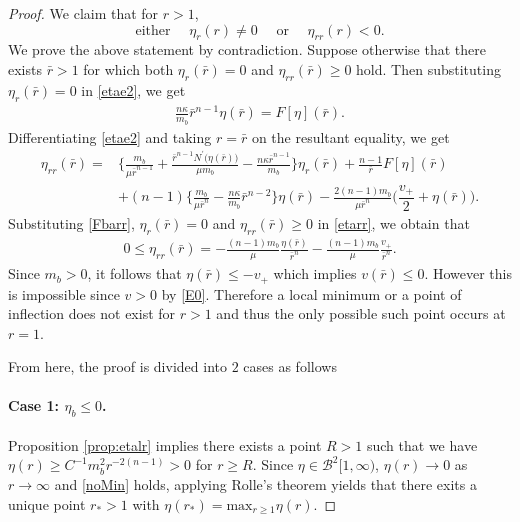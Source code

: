 \documentclass[a4paper,12pt,draft]{article}
\theoremstyle{remark}
\def\d{\partial}
\begin{document}
\begin{proof}
    We claim that for $r>1$,
    \begin{equation}\label{noMin}
        \text{either } \quad  \eta_r(r) \neq 0 \quad \text{ or } \quad \eta_{rr}(r) < 0. 
    \end{equation}
    We prove the above statement by contradiction. Suppose otherwise that there exists $\bar{r}> 1$ for which both $\eta_r(\bar{r}) = 0$ and $ \eta_{rr}(\bar{r})\ge 0$ hold. Then substituting $\eta_r(\bar{r})=0$ in \eqref{etae2}, we get
    \begin{align} \label{Fbarr}
        \frac{n\kappa}{m_b} \bar{r}^{n-1} \eta(\bar{r}) = F[\eta](\bar{r}). 
    \end{align}
    Differentiating \eqref{etae2} and taking $r=\bar{r}$ on the resultant equality, we get
    \begin{align}
        \nonumber \eta_{rr}(\bar{r}) %
        =& \Big\{\frac{m_b}{\mu \bar{r}^{n-1}}+ \frac{\bar{r}^{n-1}N^{\prime}\big(\eta(\bar{r})\big)}{\mu m_b} - \frac{n\kappa \bar{r}^{n-1}}{m_b}\Big\}\eta_r(\bar{r}) +\frac{n-1}{\bar{r}} F[\eta](\bar{r}) \\
        & + (n-1) \Big\{\frac{m_b}{\mu \bar{r}^n} - \frac{n\kappa}{m_b} \bar{r}^{n-2}\Big\}\eta(\bar{r}) - \frac{2(n-1)m_b}{\mu \bar{r}^n}\Big( \dfrac{v_{+}}{2} + \eta(\bar{r}) \Big).\label{etarr}
    \end{align}
    Substituting \eqref{Fbarr}, $\eta_r(\bar{r})=0$ and $\eta_{rr}(\bar{r})\ge 0$ in \eqref{etarr}, we obtain that
    \begin{align*}
        0 \le \eta_{rr}(\bar{r}) = -\frac{(n-1)m_b}{\mu} \frac{\eta(\bar{r})}{\bar{r}^n} - \frac{(n-1)m_b}{\mu} \frac{v_+}{\bar{r}^n}.
    \end{align*}
    Since $m_b>0$, it follows that $\eta(\bar{r})\le - v_{+}$ which implies $v(\bar{r})\le 0$. However this is impossible since $v>0$ by \eqref{E0}. Therefore a local minimum or a point of inflection does not exist for $r>1$ and thus the only possible such point occurs at $r=1$. 
    
    From here, the proof is divided into $2$ cases as follows
    \paragraph{\bf Case 1: $\eta_b \le 0$.} Proposition \ref{prop:etalr} implies there exists a point $R>1$ such that we have $\eta(r)\ge C^{-1} m_b^2 r^{-2(n-1)}>0$ for $r\ge R$. Since $\eta\in \mathcal{B}^2[1,\infty)$, $\eta(r)\to 0$ as $r\to \infty$ and \eqref{noMin} holds, applying Rolle's theorem yields that there exits a unique point $r_{\ast}>1$ with $\eta(r_{\ast})=\text{max}_{r\ge 1} \eta(r)$.    

\end{proof}
\end{document}
